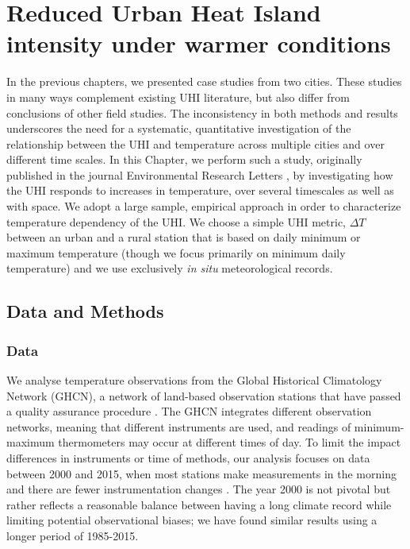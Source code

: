 \chapter{Reduced Urban Heat Island intensity under warmer conditions}
\label{chap:hw}

In the previous chapters, we presented case studies from two cities. These studies in many ways complement existing UHI literature, but also differ from conclusions of other field studies. 
The inconsistency in both methods and results
underscores the need for a systematic, quantitative investigation of the relationship between the UHI and temperature across multiple cities and over different time scales. 
In this Chapter, we perform such a study,  originally published in the journal Environmental Research Letters \citep{scott2018reduced}, by investigating how the UHI responds to increases in temperature, over several timescales as well as with space. We adopt a large sample, empirical approach in order to characterize temperature dependency of the UHI. We choose a simple UHI metric, $\Delta T$ between an urban and a rural station that is based on daily minimum or maximum temperature (though we focus primarily on minimum daily temperature)
and we use exclusively \textit{in situ} meteorological records. 

\section{Data and Methods} \label{sec:Methods}
\subsection{Data}
We analyse temperature observations from the Global Historical Climatology Network (GHCN), a network of land-based observation stations that have passed a quality assurance procedure \citep{ghcn}. %
The GHCN integrates different observation networks, meaning that different instruments are used, and readings of minimum-maximum thermometers may occur at different times of day.
To limit the impact differences in instruments or time of methods, our analysis focuses on data between 2000 and 2015, when most stations make measurements in the morning and there are fewer instrumentation changes \citep{menne2009us}. The year 2000 is not  pivotal but rather reflects a reasonable balance between having a long climate record while limiting potential observational biases; we have found similar results using a longer period of 1985-2015. %

